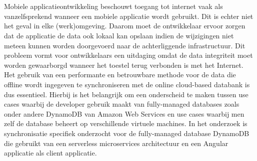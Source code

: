 



\chapter*{}

Mobiele applicatieontwikkeling beschouwt toegang tot internet vaak als vanzelfsprekend wanneer een mobiele applicatie wordt gebruikt. Dit is echter niet het geval in elke (werk)omgeving. Daarom moet de ontwikkelaar ervoor zorgen dat de applicatie de data ook lokaal kan opslaan indien de wijzigingen niet meteen kunnen worden doorgevoerd naar de achterliggende infrastructuur. Dit probleem vormt voor ontwikkelaars een uitdaging omdat de data integriteit moet worden gewaarborgd wanneer het toestel terug verbonden is met het Internet. Het gebruik van een performante en betrouwbare methode voor de data die offline wordt ingegeven te synchroniseren met de online cloud-based databank is dus essentieel. Hierbij is het belangrijk om een onderscheid te maken tussen use cases waarbij de developer gebruik maakt van fully-managed databases zoals onder andere DynamoDB van Amazon Web Services en use cases waarbij men zelf de database beheert op verschillende virtuele machines. In het onderzoek is synchronisatie specifiek onderzocht voor de fully-managed database DynamoDB die gebruikt van een serverless microservices architectuur en een Angular applicatie als client applicatie. 


